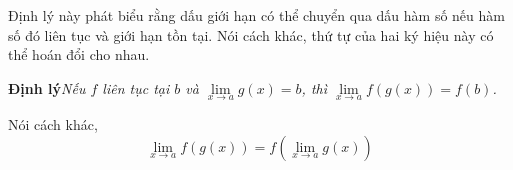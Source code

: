 \noindent
\begin{minipage}[t]{0.25\textwidth}
  \vspace{0pt}%
  {\footnotesize\noindent Định lý này phát biểu rằng dấu giới hạn có thể chuyển qua dấu hàm số nếu hàm số đó liên tục và giới hạn tồn tại. Nói cách khác, thứ tự của hai ký hiệu này có thể hoán đổi cho nhau.\par}
\end{minipage}%
\hfill
\begin{minipage}[t]{0.71\textwidth}
  \vspace{0pt}%
  \begin{definitionbox}
  \noindent{}\;\; \textbf{\textsf{\color{stewartred}Định lý}}\quad \textsl{Nếu $f$ liên tục tại $b$ và $\lim\limits_{x \to a} g(x) = b$, thì $\lim\limits_{x \to a} f(g(x)) = f(b)$.}
  \vspace{3pt}
  \par\noindent Nói cách khác,
  \[
  \lim_{x \to a} f(g(x)) = f\left(\lim_{x \to a} g(x)\right)
  \]
  \end{definitionbox}
\end{minipage}
